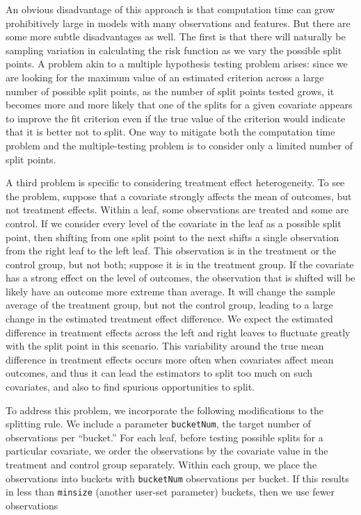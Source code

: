 \documentclass[11pt]{article}
\begin{document}
An obvious disadvantage of this approach is that computation time can grow prohibitively large in models with many observations
and features.  But there are some more subtle disadvantages as well. The first is that there will naturally be sampling variation
in calculating the risk function as we vary the possible split points. A problem akin to a multiple hypothesis testing problem arises:
since we are looking for the maximum value of an estimated criterion across a large number of possible split points,
as the number of split points tested grows, it becomes more and more likely that one of the splits for a given covariate appears to improve the fit criterion even if the true
value of the criterion would indicate that it is better not to split.  One way to mitigate both the computation time problem and
the multiple-testing problem is to consider only a limited number of split points. \par
A third problem is specific to considering treatment effect heterogeneity.  To see the problem, suppose that a covariate
strongly affects the mean of outcomes, but not treatment effects.  Within a leaf, some observations are treated and some
are control. If we consider every level of the covariate in the leaf as a possible split point, then shifting from one split point to the
next shifts a single observation from the right leaf to the left leaf.  This observation is in the treatment or the control group,
but not both; suppose it is in the treatment group.  If the covariate has a strong effect on the level of outcomes, the observation that is shifted will be likely have an
outcome more extreme than average. It will change the sample average of the treatment group, but not the control group, leading
to a large change in the estimated treatment effect difference.
We expect the estimated difference in treatment effects across the left and right leaves to fluctuate greatly with the split point in this scenario.  This
variability around the true mean difference in treatment effects occurs more often when covariates affect mean outcomes, and thus it
can lead the estimators to split too much on such covariates, and also to find spurious opportunities to split.\par
To address this problem, we incorporate the following modifications to the splitting rule.  We include a parameter \texttt{bucketNum}, 
the target number of observations per ``bucket.'' For each leaf, before testing possible
splits for a particular covariate, we order the observations by the covariate value in the treatment and control group separately.  Within each group, we place the observations into buckets with \texttt{bucketNum} observations per bucket.  If this results in less than \texttt{minsize} (another user-set parameter) buckets, then we use fewer observations
\end{document}

